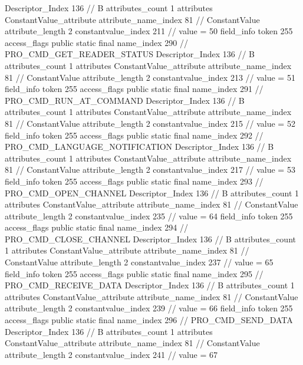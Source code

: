 {{{{{				Descriptor_Index	136		// B
				attributes_count	1
				attributes {
				ConstantValue_attribute {
					attribute_name_index	81		// ConstantValue
					attribute_length	2
					constantvalue_index	211		// value = 50
				}
				}
			}
			field_info {
				token	255
				access_flags	public static final
				name_index	290		// PRO_CMD_GET_READER_STATUS
				Descriptor_Index	136		// B
				attributes_count	1
				attributes {
				ConstantValue_attribute {
					attribute_name_index	81		// ConstantValue
					attribute_length	2
					constantvalue_index	213		// value = 51
				}
				}
			}
			field_info {
				token	255
				access_flags	public static final
				name_index	291		// PRO_CMD_RUN_AT_COMMAND
				Descriptor_Index	136		// B
				attributes_count	1
				attributes {
				ConstantValue_attribute {
					attribute_name_index	81		// ConstantValue
					attribute_length	2
					constantvalue_index	215		// value = 52
				}
				}
			}
			field_info {
				token	255
				access_flags	public static final
				name_index	292		// PRO_CMD_LANGUAGE_NOTIFICATION
				Descriptor_Index	136		// B
				attributes_count	1
				attributes {
				ConstantValue_attribute {
					attribute_name_index	81		// ConstantValue
					attribute_length	2
					constantvalue_index	217		// value = 53
				}
				}
			}
			field_info {
				token	255
				access_flags	public static final
				name_index	293		// PRO_CMD_OPEN_CHANNEL
				Descriptor_Index	136		// B
				attributes_count	1
				attributes {
				ConstantValue_attribute {
					attribute_name_index	81		// ConstantValue
					attribute_length	2
					constantvalue_index	235		// value = 64
				}
				}
			}
			field_info {
				token	255
				access_flags	public static final
				name_index	294		// PRO_CMD_CLOSE_CHANNEL
				Descriptor_Index	136		// B
				attributes_count	1
				attributes {
				ConstantValue_attribute {
					attribute_name_index	81		// ConstantValue
					attribute_length	2
					constantvalue_index	237		// value = 65
				}
				}
			}
			field_info {
				token	255
				access_flags	public static final
				name_index	295		// PRO_CMD_RECEIVE_DATA
				Descriptor_Index	136		// B
				attributes_count	1
				attributes {
				ConstantValue_attribute {
					attribute_name_index	81		// ConstantValue
					attribute_length	2
					constantvalue_index	239		// value = 66
				}
				}
			}
			field_info {
				token	255
				access_flags	public static final
				name_index	296		// PRO_CMD_SEND_DATA
				Descriptor_Index	136		// B
				attributes_count	1
				attributes {
				ConstantValue_attribute {
					attribute_name_index	81		// ConstantValue
					attribute_length	2
					constantvalue_index	241		// value = 67
}}}}}}}
